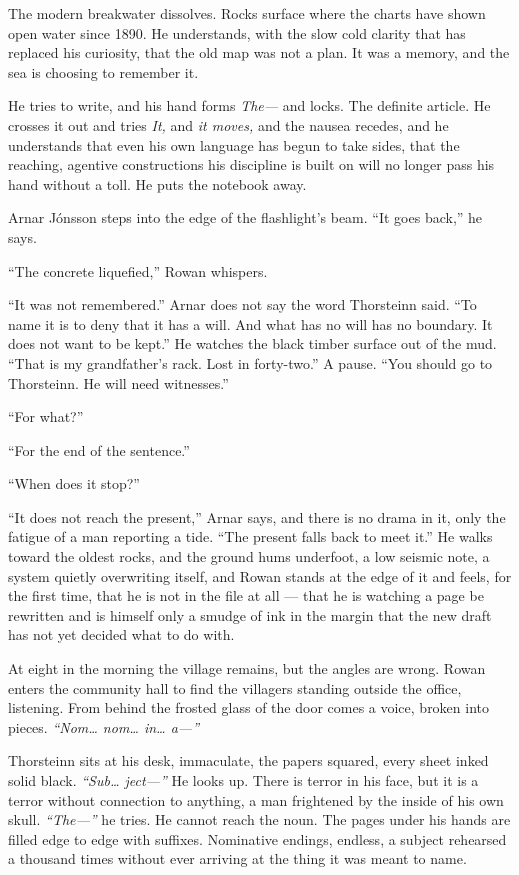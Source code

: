 \documentclass[11pt,oneside]{book}
\newcommand{\sceneline}{%
  \par\vspace{1.2em}
  \begin{center}
    \fontsize{11}{11}\selectfont \textbullet\quad\textbullet\quad\textbullet
  \end{center}
  \vspace{0.6em}\noindent\ignorespaces
}
\begin{document}
The modern breakwater dissolves. Rocks surface where the charts have
shown open water since 1890. He understands, with the slow cold clarity
that has replaced his curiosity, that the old map was not a plan. It was
a memory, and the sea is choosing to remember it.

He tries to write, and his hand forms \emph{The---} and locks. The
definite article. He crosses it out and tries \emph{It,} and \emph{it
moves,} and the nausea recedes, and he understands that even his own
language has begun to take sides, that the reaching, agentive
constructions his discipline is built on will no longer pass his hand
without a toll. He puts the notebook away.

Arnar Jónsson steps into the edge of the flashlight's beam. ``It goes
back,'' he says.

``The concrete liquefied,'' Rowan whispers.

``It was not remembered.'' Arnar does not say the word Thorsteinn said.
``To name it is to deny that it has a will. And what has no will has no
boundary. It does not want to be kept.'' He watches the black timber
surface out of the mud. ``That is my grandfather's rack. Lost in
forty-two.'' A pause. ``You should go to Thorsteinn. He will need
witnesses.''

``For what?''

``For the end of the sentence.''

``When does it stop?''

``It does not reach the present,'' Arnar says, and there is no drama in
it, only the fatigue of a man reporting a tide. ``The present falls back
to meet it.'' He walks toward the oldest rocks, and the ground hums
underfoot, a low seismic note, a system quietly overwriting itself, and
Rowan stands at the edge of it and feels, for the first time, that he is
not in the file at all --- that he is watching a page be rewritten and
is himself only a smudge of ink in the margin that the new draft has not
yet decided what to do with.

\sceneline

At eight in the morning the village remains, but the angles are wrong.
Rowan enters the community hall to find the villagers standing outside
the office, listening. From behind the frosted glass of the door comes a
voice, broken into pieces. \emph{``Nom\ldots{} nom\ldots{} in\ldots{}
a---''}

Thorsteinn sits at his desk, immaculate, the papers squared, every sheet
inked solid black. \emph{``Sub\ldots{} ject---''} He looks up. There is
terror in his face, but it is a terror without connection to anything, a
man frightened by the inside of his own skull. \emph{``The---''} he
tries. He cannot reach the noun. The pages under his hands are filled
edge to edge with suffixes. Nominative endings, endless, a subject
rehearsed a thousand times without ever arriving at the thing it was
meant to name.
\end{document}
